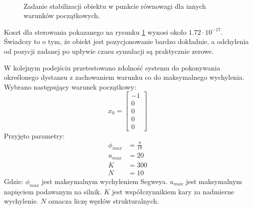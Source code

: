 \begin{figure}[H]
	~~
	\caption{Zadanie stabilizacji obiektu w punkcie równowagi dla innych warunków początkowych.}
	\label{fig:stab}
\end{figure}

Koszt dla sterowania pokazanego na rysunku \ref{fig:stab} wynosi około \(1.72 \cdot 10^{-17}\). Świadczy to o tym, że obiekt jest pozycjonowanie bardzo dokładnie, a odchylenia od pozycji zadanej po upływie czasu symulacji są praktycznie zerowe.

\newpage
W kolejnym podejściu przetestowano zdolność systemu do pokonywania określonego dystansu z zachowaniem warunku co do maksymalnego wychylenia. Wybrano następujący warunek początkowy:
\begin{equation}
x_0=\begin{bmatrix}
-1\\
0\\
0\\
0\\
0
\end{bmatrix}
\end{equation}
Przyjęto parametry:
\begin{equation}
\begin{aligned}
\phi_{max}&=\frac{\pi}{18}\\
u_{max}&=20\\
K&=300\\
N&=10
\end{aligned}
\end{equation}
\noindent Gdzie:\newline
\(\phi_{max}\) jest maksymalnym wychyleniem Segweya.\newline
\(u_{max}\) jest maksymalnym napięciem podawanym na silnik.\newline
\(K\) jest współczynnikiem kary za nadmierne wychylenie.\newline
\(N\) oznacza liczę węzłów strukturalnych.
